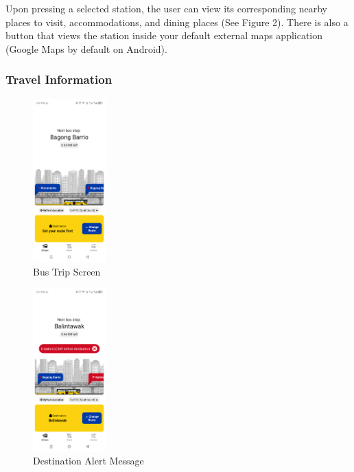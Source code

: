 \documentclass{icsthesis}
\begin{document}
\begin{mainmatter}
Upon pressing a selected station, the user can view its corresponding nearby places to visit, accommodations, and dining places (See Figure 2). There is also a button that views the station inside your default external maps application (Google Maps by default on Android).

\subsubsection{\textbf{Travel Information}}

\begin{figure}[htbp]
  \centering
  \includegraphics[width=0.25\textwidth]{Texfiles/screenshots/EDSAan_trip.png}
  \caption{Bus Trip Screen}
  \label{fig:yourlabel}
\end{figure}

\begin{figure}[htbp]
  \centering
  \includegraphics[width=0.25\textwidth]{Texfiles/screenshots/EDSAan_alertbefore.png}
  \caption{Destination Alert Message}
  \label{fig:yourlabel}
\end{figure}


\end{mainmatter}
\end{document}
